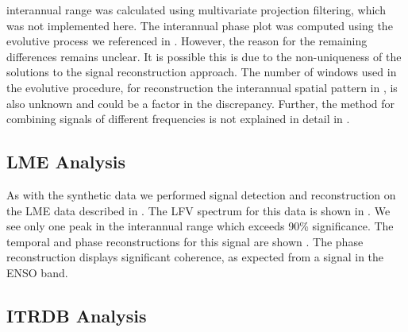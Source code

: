 \documentclass[phd,tocprelim]{cornell}
\begin{document}
interannual range was calculated using multivariate projection filtering, 
which was not implemented here. The interannual phase plot was computed 
using the evolutive process we referenced in . However, the 
reason for the remaining differences remains unclear. It is possible 
this is due to the non-uniqueness of the solutions to the signal 
reconstruction approach. The number of windows used in the evolutive 
procedure, for reconstruction the interannual spatial pattern in 
\cite{mann1999oscillatory}, is also unknown and could be a factor in 
the discrepancy. Further, the method for combining signals of 
different frequencies is not explained in detail in 
\cite{mann1999oscillatory}. 

\subsection{LME Analysis}\label{anal:lme}
As with the synthetic data we performed signal detection and reconstruction 
on the LME data described in . The LFV spectrum for this 
data is shown in . We see only one peak in the interannual 
range which exceeds 90\% significance. The temporal and phase reconstructions 
for this signal are shown . The phase reconstruction 
displays significant coherence, as expected from a signal in the ENSO band. 

\subsection{ITRDB Analysis}\label{anal:itrdb}
\end{document}

